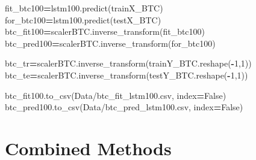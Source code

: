 \documentclass[
]{article}
\newenvironment{Shaded}{\begin{snugshade}}{\end{snugshade}}
\newcommand{\DecValTok}[1]{\textcolor[rgb]{0.00,0.00,0.81}{#1}}
\newcommand{\NormalTok}[1]{#1}
\newcommand{\OperatorTok}[1]{\textcolor[rgb]{0.81,0.36,0.00}{\textbf{#1}}}
\newcommand{\StringTok}[1]{\textcolor[rgb]{0.31,0.60,0.02}{#1}}
\newcommand{\VariableTok}[1]{\textcolor[rgb]{0.00,0.00,0.00}{#1}}
\begin{document}
\begin{Shaded}
\begin{Highlighting}[]
\NormalTok{fit\_btc100}\OperatorTok{=}\NormalTok{lstm100.predict(trainX\_BTC)}
\NormalTok{for\_btc100}\OperatorTok{=}\NormalTok{lstm100.predict(testX\_BTC)}
\NormalTok{btc\_fit100}\OperatorTok{=}\NormalTok{scalerBTC.inverse\_transform(fit\_btc100)}
\NormalTok{btc\_pred100}\OperatorTok{=}\NormalTok{scalerBTC.inverse\_transform(for\_btc100)}

\NormalTok{btc\_tr}\OperatorTok{=}\NormalTok{scalerBTC.inverse\_transform(trainY\_BTC.reshape(}\OperatorTok{{-}}\DecValTok{1}\NormalTok{,}\DecValTok{1}\NormalTok{))}
\NormalTok{btc\_te}\OperatorTok{=}\NormalTok{scalerBTC.inverse\_transform(testY\_BTC.reshape(}\OperatorTok{{-}}\DecValTok{1}\NormalTok{,}\DecValTok{1}\NormalTok{))}

\NormalTok{btc\_fit100.to\_csv(}\StringTok{\textquotesingle{}Data/btc\_fit\_lstm100.csv\textquotesingle{}}\NormalTok{, index}\OperatorTok{=}\VariableTok{False}\NormalTok{)}
\NormalTok{btc\_pred100.to\_csv(}\StringTok{\textquotesingle{}Data/btc\_pred\_lstm100.csv\textquotesingle{}}\NormalTok{, index}\OperatorTok{=}\VariableTok{False}\NormalTok{)}
\end{Highlighting}
\end{Shaded}

\section{Combined Methods}\label{combined-methods}
\end{document}
